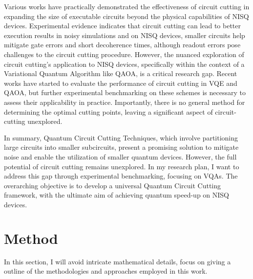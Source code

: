 \documentclass[]{article}
\begin{document}
Various works have practically demonstrated the effectiveness of circuit cutting in expanding the size of executable circuits beyond the physical capabilities of NISQ devices\cite{PhysRevX.6.021043,Mitarai_2021}. Experimental evidence indicates that circuit cutting can lead to better execution results in noisy simulations and on NISQ devices\cite{QDCA,CutQC,PhysRevLett.130.110601}, smaller circuits help mitigate gate errors and short decoherence times, although readout errors pose challenges to the circuit cutting procedure\cite{Ayral_2021}. However, the nuanced exploration of circuit cutting's application to NISQ devices, specifically within the context of a Variational Quantum Algorithm like QAOA, is a critical research gap. Recent works have started to evaluate the performance of circuit cutting in VQE\cite{PRXQuantum.3.010346} and QAOA\cite{Bechtold_2023}, but further experimental benchmarking on these schemes is necessary to assess their applicability in practice. Importantly, there is no general method for determining the optimal cutting points, leaving a significant aspect of circuit-cutting unexplored\cite{PhysRevLett.130.110601,Bechtold_2023}.

In summary, Quantum Circuit Cutting Techniques, which involve partitioning large circuits into smaller subcircuits, present a promising solution to mitigate noise and enable the utilization of smaller quantum devices. However, the full potential of circuit cutting remains unexplored. In my research plan, I want to address this gap through experimental benchmarking, focusing on VQAs. The overarching objective is to develop a universal Quantum Circuit Cutting framework, with the ultimate aim of achieving quantum speed-up on NISQ devices.

\section{Method}

In this section, I will avoid intricate mathematical details, focus on giving a outline of the methodologies and approaches employed in this work.
\end{document}

